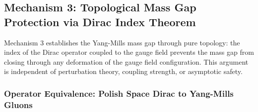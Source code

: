 \subsection{Mechanism 3: Topological Mass Gap Protection via Dirac Index Theorem}
\label{subsec:mechanism3Dirac}

Mechanism 3 establishes the Yang-Mills mass gap through pure topology: the index of the Dirac operator coupled to the gauge field prevents the mass gap from closing through any deformation of the gauge field configuration. This argument is independent of perturbation theory, coupling strength, or asymptotic safety.

\subsubsection{Operator Equivalence: Polish Space Dirac to Yang-Mills Gluons}

